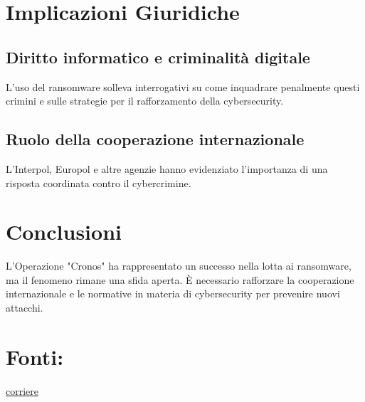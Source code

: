 \documentclass[a4paper,12pt]{article}
\begin{document}
\section{Implicazioni Giuridiche}
\subsection{Diritto informatico e criminalità digitale}
L'uso del ransomware solleva interrogativi su come inquadrare penalmente questi crimini e sulle strategie per il rafforzamento della cybersecurity.

\subsection{Ruolo della cooperazione internazionale}
L'Interpol, Europol e altre agenzie hanno evidenziato l'importanza di una risposta coordinata contro il cybercrimine.

\section{Conclusioni}
L'Operazione "Cronos" ha rappresentato un successo nella lotta ai ransomware, ma il fenomeno rimane una sfida aperta. È necessario rafforzare la cooperazione internazionale e le normative in materia di cybersecurity per prevenire nuovi attacchi.

\newpage
\section{Fonti:}
\hyperlink{https://www.corriere.it/tecnologia/23_dicembre_19/chi-sono-i-russi-di-lockbit-hacker-che-hanno-bloccato-la-pubblica-amministrazione-politica-contano-solo-i-soldi-695b2492-8908-4e12-993c-5cb23941dxlk.shtml}
{corriere}
\end{document}
